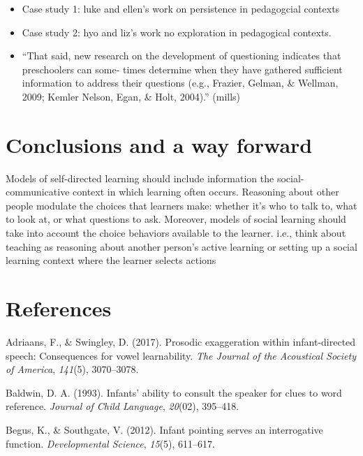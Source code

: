 \documentclass[english,man]{apa6}
\theoremstyle{definition}
\theoremstyle{definition}
\theoremstyle{definition}
\theoremstyle{remark}
\begin{document}
\begin{itemize}
\item
  Case study 1: luke and ellen's work on persistence in pedagogcial
  contexts
\item
  Case study 2: hyo and liz's work no exploration in pedagogical
  contexts.
\item
  \enquote{That said, new research on the development of questioning
  indicates that preschoolers can some- times determine when they have
  gathered sufficient information to address their questions (e.g.,
  Frazier, Gelman, \& Wellman, 2009; Kemler Nelson, Egan, \& Holt,
  2004).} (mills)
\end{itemize}

\section{Conclusions and a way
forward}\label{conclusions-and-a-way-forward}

Models of self-directed learning should include information the
social-communicative context in which learning often occurs. Reasoning
about other people modulate the choices that learners make: whether it's
who to talk to, what to look at, or what questions to ask. Moreover,
models of social learning should take into account the choice behaviors
available to the learner. i.e., think about teaching as reasoning about
another person's active learning or setting up a social learning context
where the learner selects actions

\newpage

\section{References}\label{references}

\setlength{\parindent}{-0.5in} \setlength{\leftskip}{0.5in}

\hypertarget{refs}{}
\hypertarget{ref-adriaans2017prosodic}{}
Adriaans, F., \& Swingley, D. (2017). Prosodic exaggeration within
infant-directed speech: Consequences for vowel learnability. \emph{The
Journal of the Acoustical Society of America}, \emph{141}(5),
3070--3078.

\hypertarget{ref-baldwin1993infants}{}
Baldwin, D. A. (1993). Infants' ability to consult the speaker for clues
to word reference. \emph{Journal of Child Language}, \emph{20}(02),
395--418.

\hypertarget{ref-begus2012infant}{}
Begus, K., \& Southgate, V. (2012). Infant pointing serves an
interrogative function. \emph{Developmental Science}, \emph{15}(5),
611--617.
\end{document}
